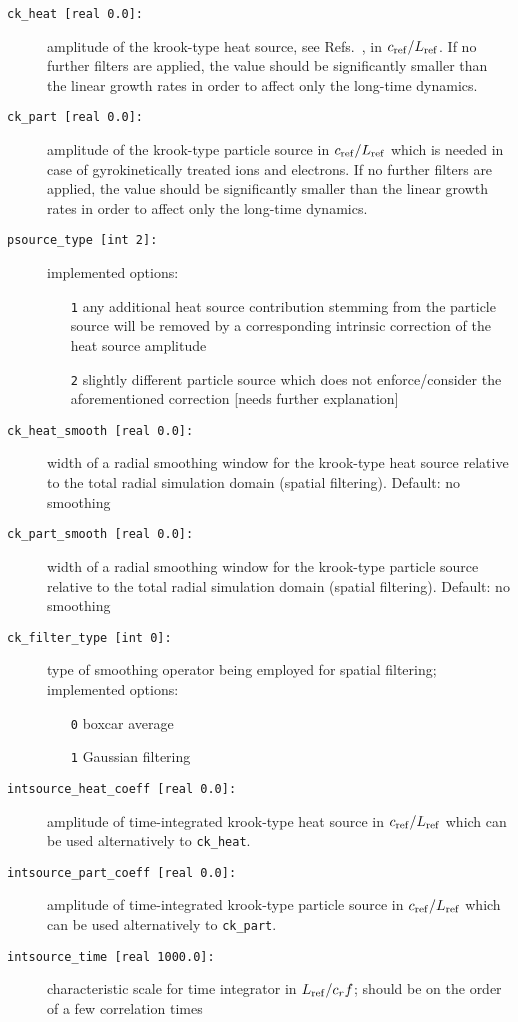 \documentclass[12pt]{article}
\begin{document}
\begin{description}
\item[\texttt{ck\_heat [real 0.0]:}] amplitude of the krook-type heat source, see Refs.~\cite{LapillonnePhD,gene2,ToldPhD}, in $c_{\rm ref}/L_{\rm ref}$. If no further filters are applied,
the value should be significantly smaller than the linear growth rates in order to affect only the long-time dynamics.
\item[\texttt{ck\_part [real 0.0]:}] amplitude of the krook-type particle source\cite{ToldPhD} in $c_{\rm ref}/L_{\rm ref}$ which is needed in case of gyrokinetically treated ions and electrons.
If no further filters are applied, the value should be significantly smaller than the linear growth rates in order to affect only the long-time dynamics.
\item[\texttt{psource\_type [int 2]:}] implemented options:
\begin{itemize}
 \item [{\tt 1}] any additional heat source contribution stemming from the particle source will be removed by a corresponding intrinsic correction of the heat source amplitude
 \item [{\tt 2}] slightly different particle source which does not enforce/consider the aforementioned correction [needs further explanation]
\end{itemize}
\item[\texttt{ck\_heat\_smooth [real 0.0]:}] width of a radial smoothing window for the krook-type heat source relative to the total radial simulation domain (spatial filtering). Default: no smoothing
\item[\texttt{ck\_part\_smooth [real 0.0]:}] width of a radial smoothing window for the krook-type particle source relative to the total radial simulation domain (spatial filtering). Default: no smoothing
\item[\texttt{ck\_filter\_type [int 0]:}] type of smoothing operator being employed for spatial filtering; implemented options:
\begin{itemize}
 \item [{\tt 0}] boxcar average
 \item [{\tt 1}] Gaussian filtering
\end{itemize}
\item[\texttt{intsource\_heat\_coeff [real 0.0]:}] amplitude of time-integrated krook-type heat source in $c_{\rm ref}/L_{\rm ref}$ which can be used alternatively to \texttt{ck\_heat}.
\item[\texttt{intsource\_part\_coeff [real 0.0]:}] amplitude of time-integrated krook-type particle source in $c_{\rm ref}/L_{\rm ref}$ which can be used alternatively to \texttt{ck\_part}.
\item[\texttt{intsource\_time [real 1000.0]:}] characteristic scale for time integrator in $L_{\rm ref}/c_rf$; should be on the order of a few correlation times
\end{description}
\end{document}
